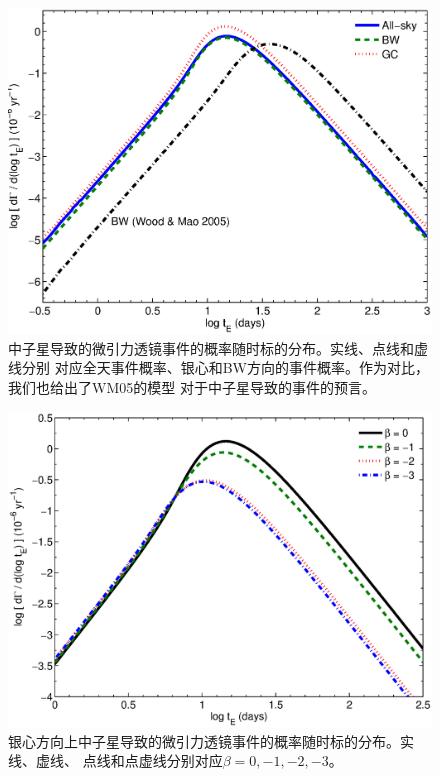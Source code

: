 \begin{figure}
\begin{center}
  \includegraphics[width=4 in,trim=0 0 0 3cm]{timescale.eps}
\caption{中子星导致的微引力透镜事件的概率随时标的分布。实线、点线和虚线分别
对应全天事件概率、银心和BW方向的事件概率。作为对比，我们也给出了WM05的模型
对于中子星导致的事件的预言。}
\label{timescale}
\end{center}
\end{figure}

%
\begin{figure}
\begin{center}
  \includegraphics[width=4 in,trim=0 0 0 3cm]{time_beta.eps}
%
\caption{银心方向上中子星导致的微引力透镜事件的概率随时标的分布。实线、虚线、
点线和点虚线分别对应$\beta=0,-1,-2,-3$。}
\label{timescale_beta}
\end{center}
\end{figure}
%

